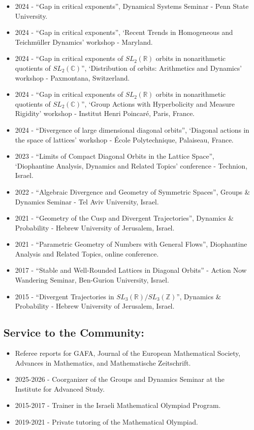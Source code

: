 \begin{itemize}
\item
  2024 - ``Gap in critical exponents'', Dynamical Systems Seminar - Penn
  State University.
\item
  2024 - ``Gap in critical exponents'', `Recent Trends in Homogeneous
  and Teichm\"uller Dynamics' workshop - Maryland.
\item
  2024 - ``Gap in critical exponents of $SL_2(\mathbb R)$ orbits in nonarithmetic
  quotients of $SL_2(\mathbb C)$'', `Distribution of orbits: Arithmetics and
  Dynamics' workshop - Paxmontana, Switzerland.
\item
  2024 - ``Gap in critical exponents of $SL_2(\mathbb R)$ orbits in nonarithmetic
  quotients of $SL_2(\mathbb C)$'', `Group Actions with Hyperbolicity and Measure
  Rigidity' workshop - Institut Henri Poincar\'e, Paris, France.
\item
  2024 - ``Divergence of large dimensional diagonal orbits'', `Diagonal
  actions in the space of lattices' workshop - \'Ecole Polytechnique,
  Palaiseau, France.
\item
  2023 - ``Limits of Compact Diagonal Orbits in the Lattice Space'',
  `Diophantine Analysis, Dynamics and Related Topics' conference -
  Technion, Israel.
\item
  2022 - ``Algebraic Divergence and Geometry of Symmetric Spaces'',
  Groups \& Dynamics Seminar - Tel Aviv University, Israel.
\item
  2021 - ``Geometry of the Cusp and Divergent Trajectories'', Dynamics
  \& Probability - Hebrew University of Jerusalem, Israel.
\item
  2021 - ``Parametric Geometry of Numbers with General Flows'',
  Diophantine Analysis and Related Topics, online conference.
\item
  2017 - ``Stable and Well-Rounded Lattices in Diagonal Orbits'' -
  Action Now Wandering Seminar, Ben-Gurion University, Israel.
\item
  2015 - ``Divergent Trajectories in $SL_3(\mathbb R)/SL_3(\mathbb Z)$'', Dynamics \&
  Probability - Hebrew University of Jerusalem, Israel.
\end{itemize}

\hypertarget{service-to-the-community}{%
\subsection{\texorpdfstring{\textbf{Service to the
Community:}}{Service to the Community:}}\label{service-to-the-community}}

\begin{itemize}
\tightlist
\item
  Referee reports for GAFA, Journal of the European Mathematical Society,
  Advances in Mathematics, and Mathematische Zeitschrift.
\item
  2025-2026 - Coorganizer of the Groups and Dynamics Seminar at the
  Institute for Advanced Study.
\item
  2015-2017 - Trainer in the Israeli Mathematical Olympiad Program.
\item
  2019-2021 - Private tutoring of the Mathematical Olympiad.
\end{itemize}
